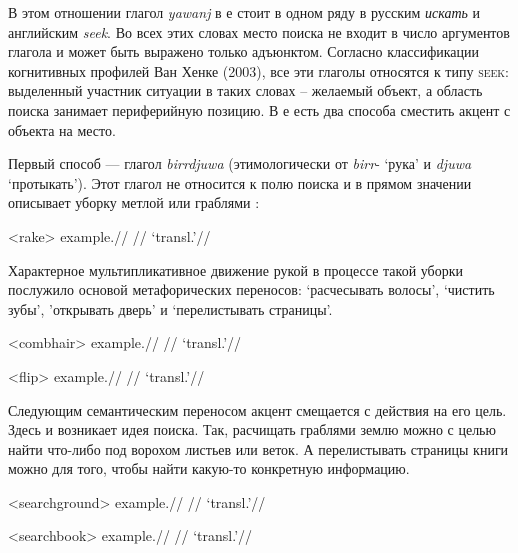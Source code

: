 В этом отношении глагол \textit{yawanj} в  е стоит в одном ряду в русским \textit{искать} и английским \textit{seek}. Во всех этих словах место поиска не входит в число аргументов глагола и может быть выражено только адъюнктом. Согласно классификации когнитивных профилей Ван Хенке (2003), все эти глаголы относятся к типу \textsc{seek}: выделенный участник ситуации в таких словах -- желаемый объект, а область поиска занимает периферийную позицию. В  е есть два способа сместить акцент с объекта на место. 

Первый способ --- глагол \textit{birrdjuwa} (этимологически от \textit{birr}- `рука' и \textit{djuwa} `протыкать'). Этот глагол не относится к полю поиска и в прямом значении описывает уборку метлой или граблями :

\ex<rake>\begingl
\gla example.//
\glb //
\glft `transl.'\trailingcitation{[src]}//
\endgl\xe

Характерное мультипликативное движение рукой в процессе такой уборки послужило основой метафорических переносов: `расчесывать волосы', `чистить зубы', 'открывать дверь' и `перелистывать страницы'.

\ex<combhair>\begingl
\gla example.//
\glb //
\glft `transl.'\trailingcitation{[src]}//
\endgl\xe

\ex<flip>\begingl
\gla example.//
\glb //
\glft `transl.'\trailingcitation{[src]}//
\endgl\xe

Следующим семантическим переносом акцент смещается с действия на его цель. Здесь и возникает идея поиска. Так, расчищать граблями землю можно с целью  найти что-либо под ворохом листьев или веток. А перелистывать страницы книги можно для того, чтобы найти какую-то конкретную информацию.

\ex<searchground>\begingl
\gla example.//
\glb //
\glft `transl.'\trailingcitation{[src]}//
\endgl\xe

\ex<searchbook>\begingl
\gla example.//
\glb //
\glft `transl.'\trailingcitation{[src]}//
\endgl\xe




